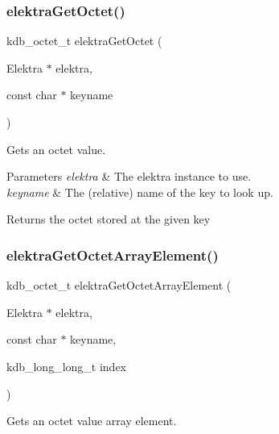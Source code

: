 \subsubsection{\texorpdfstring{elektra\+Get\+Octet()}{elektraGetOctet()}}
{\footnotesize\ttfamily kdb\+\_\+octet\+\_\+t elektra\+Get\+Octet (\begin{DoxyParamCaption}\item[{Elektra $\ast$}]{elektra,  }\item[{const char $\ast$}]{keyname }\end{DoxyParamCaption})}



Gets an octet value. 


\begin{DoxyParams}{Parameters}
{\em elektra} & The elektra instance to use. \\
\hline
{\em keyname} & The (relative) name of the key to look up. \\
\hline
\end{DoxyParams}
\begin{DoxyReturn}{Returns}
the octet stored at the given key 
\end{DoxyReturn}
\mbox{\label{group__highlevel_ga2c67031aef8c34c639ec56b87006386d}} 
\subsubsection{\texorpdfstring{elektra\+Get\+Octet\+Array\+Element()}{elektraGetOctetArrayElement()}}
{\footnotesize\ttfamily kdb\+\_\+octet\+\_\+t elektra\+Get\+Octet\+Array\+Element (\begin{DoxyParamCaption}\item[{Elektra $\ast$}]{elektra,  }\item[{const char $\ast$}]{keyname,  }\item[{kdb\+\_\+long\+\_\+long\+\_\+t}]{index }\end{DoxyParamCaption})}



Gets an octet value array element. 


